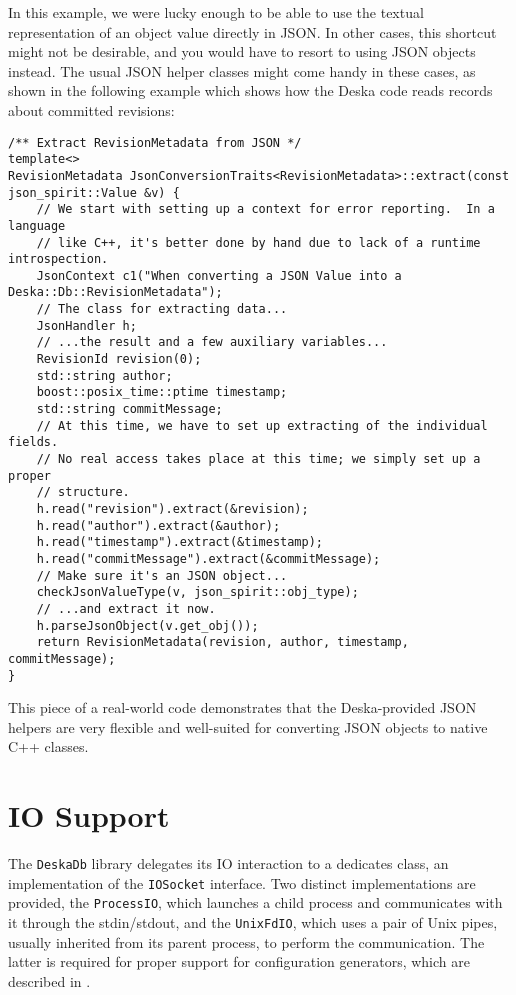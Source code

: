 \documentclass[deska]{subfiles}
\begin{document}
In this example, we were lucky enough to be able to use the textual representation of an object value directly in JSON.
In other cases, this shortcut might not be desirable, and you would have to resort to using JSON objects instead.  The
usual JSON helper classes might come handy in these cases, as shown in the following example which shows how the Deska
code reads records about committed revisions:

\begin{verbatim}
/** Extract RevisionMetadata from JSON */
template<>
RevisionMetadata JsonConversionTraits<RevisionMetadata>::extract(const json_spirit::Value &v) {
    // We start with setting up a context for error reporting.  In a language
    // like C++, it's better done by hand due to lack of a runtime introspection.
    JsonContext c1("When converting a JSON Value into a Deska::Db::RevisionMetadata");
    // The class for extracting data...
    JsonHandler h;
    // ...the result and a few auxiliary variables...
    RevisionId revision(0);
    std::string author;
    boost::posix_time::ptime timestamp;
    std::string commitMessage;
    // At this time, we have to set up extracting of the individual fields.
    // No real access takes place at this time; we simply set up a proper
    // structure.
    h.read("revision").extract(&revision);
    h.read("author").extract(&author);
    h.read("timestamp").extract(&timestamp);
    h.read("commitMessage").extract(&commitMessage);
    // Make sure it's an JSON object...
    checkJsonValueType(v, json_spirit::obj_type);
    // ...and extract it now.
    h.parseJsonObject(v.get_obj());
    return RevisionMetadata(revision, author, timestamp, commitMessage);
}
\end{verbatim}

This piece of a real-world code demonstrates that the Deska-provided JSON helpers are very flexible and well-suited for
converting JSON objects to native C++ classes.

\section{IO Support}

The {\tt DeskaDb} library delegates its IO interaction to a dedicates class, an implementation of the {\tt IOSocket}
interface.  Two distinct implementations are provided, the {\tt ProcessIO}, which launches a child process and
communicates with it through the stdin/stdout, and the {\tt UnixFdIO}, which uses a pair of Unix pipes, usually
inherited from its parent process, to perform the communication.  The latter is required for proper support for
configuration generators, which are described in .
\end{document}
